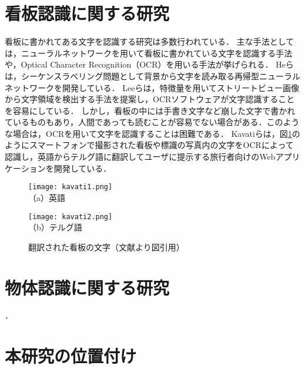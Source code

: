\section{看板認識に関する研究}
  看板に書かれてある文字を認識する研究は多数行われている．
  主な手法としては，ニューラルネットワークを用いて看板に書かれている文字を認識する手法や，Optical Character Recognition（OCR）を用いる手法が挙げられる．
  Heらは，シーケンスラベリング問題として背景から文字を読み取る再帰型ニューラルネットワークを開発している\cite{He:2016}．
  Leeらは，特徴量を用いてストリートビュー画像から文字領域を検出する手法を提案し，OCRソフトウェアが文字認識することを容易にしている\cite{Lee:2016}．
  しかし，看板の中には手書き文字など崩した文字で書かれているものもあり，人間であっても読むことが容易でない場合がある．このような場合は，OCRを用いて文字を認識することは困難である．
  Kavatiらは，図\ref{figure:kavati}のようにスマートフォンで撮影された看板や標識の写真内の文字をOCRによって認識し，英語からテルグ語に翻訳してユーザに提示する旅行者向けのWebアプリケーションを開発している\cite{Kavati:2017}．
  \begin{figure}[tb]
    \begin{minipage}{0.49\hsize}
      \begin{center}
        \texttt{[image: kavati1.png]}\\
        \small{（a）英語}
      \end{center}
    \end{minipage}
    \begin{minipage}{0.49\hsize}
      \begin{center}
        \texttt{[image: kavati2.png]}\\
        \small{（b）テルグ語}
      \end{center}
    \end{minipage}
    \vspace{2pt}
    \caption{翻訳された看板の文字（文献\cite{Kavati:2017}より図引用）}
    \label{figure:kavati}
  \end{figure}
  
\section{物体認識に関する研究}
  \cite{Doi:2018}．
\section{本研究の位置付け}
